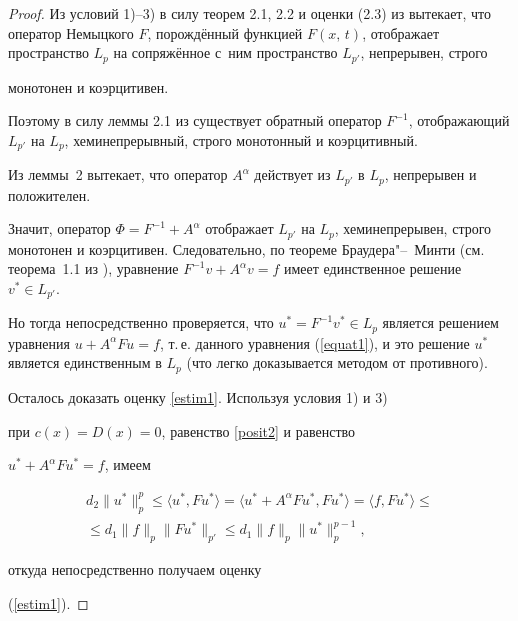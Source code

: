 \begin{proof}

Из условий 1)--3) в силу теорем 2.1, 2.2 и оценки (2.3) из \cite{askhabov:ASK} вытекает, что оператор Немыцкого $F$, порождённый функцией $F(x,\, t)$, отображает пространство $L_p$ на сопряжённое с~ним пространство $L_{p'}$, непрерывен, строго

монотонен и коэрцитивен. 

Поэтому в силу леммы 2.1 из \cite{askhabov:ASK} существует обратный оператор $F^{-1}$, отображающий $L_{p'}$ на $L_p$, хеминепрерывный, строго монотонный и коэрцитивный. 

Из леммы~2 вытекает, что оператор $A^\alpha$ действует из $L_{p'}$ в $L_p$, непрерывен и положителен. 

Значит, оператор $\Phi=F^{-1}+A^\alpha$ отображает $L_{p'}$ на $L_p$, хеминепрерывен, строго монотонен и коэрцитивен. Следовательно, по теореме Браудера"--~Минти (см. теорема~1.1 из \cite{askhabov:ASK}), уравнение $F^{-1}v+A^\alpha v=f$ имеет единственное решение $v^*\in L_{p'}$. 

Но тогда непосредственно проверяется, что $u^*=F^{-1}v^*\in L_p$ является решением уравнения $u+A^\alpha Fu=f$, т.\,е. данного уравнения (\ref{equat1}), и это решение $u^*$ является единственным в $L_p$ (что легко доказывается методом от противного).



Осталось доказать оценку \eqref{estim1}. Используя условия 1) и 3)

при $c(x)=D(x)=0$, равенство \eqref{posit2} и равенство

$u^*+A^\alpha Fu^*=f$, имеем

\begin{multline*}

d_2\|u^*\|_p^p\leq \langle u^*, Fu^*\rangle=\langle  u^*+A^\alpha

Fu^*, Fu^*\rangle =\langle f, Fu^*\rangle \leq \\ \leq d_1\|f\|_p\|Fu^*\|_{p'}\leq

d_1\|f\|_p\|u^*\|_p^{p-1},

\end{multline*}

 откуда непосредственно получаем оценку

(\ref{estim1}).

\end{proof}



\smallskip



